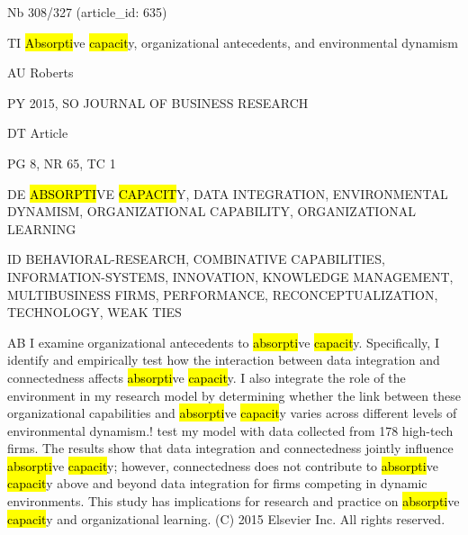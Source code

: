 \documentclass[a4paper]{article}
\begin{document}
\vspace*{-2cm}
Nb \tabto{0cm}308/327 (article\_id: 635)\par
TI \tabto{0cm}\hl{Absorpti}ve \hl{capacit}y, organizational antecedents, and environmental dynamism\par
AU \tabto{0cm}Roberts\par
PY \tabto{0cm}2015, SO JOURNAL OF BUSINESS RESEARCH\par
DT \tabto{0cm}Article\par
PG \tabto{0cm}8, NR 65, TC 1\par
DE \tabto{0cm}\hl{ABSORPTI}VE \hl{CAPACIT}Y, DATA INTEGRATION, ENVIRONMENTAL DYNAMISM, ORGANIZATIONAL CAPABILITY, ORGANIZATIONAL LEARNING\par
ID \tabto{0cm}BEHAVIORAL-RESEARCH, COMBINATIVE CAPABILITIES, INFORMATION-SYSTEMS, INNOVATION, KNOWLEDGE MANAGEMENT, MULTIBUSINESS FIRMS, PERFORMANCE, RECONCEPTUALIZATION, TECHNOLOGY, WEAK TIES\par
AB \tabto{0cm}I examine organizational antecedents to \hl{absorpti}ve \hl{capacit}y. Specifically, I identify and empirically test how the interaction between data integration and connectedness affects \hl{absorpti}ve \hl{capacit}y. I also integrate the role of the environment in my research model by determining whether the link between these organizational capabilities and \hl{absorpti}ve \hl{capacit}y varies across different levels of environmental dynamism.! test my model with data collected from 178 high-tech firms. The results show that data integration and connectedness jointly influence \hl{absorpti}ve \hl{capacit}y; however, connectedness does not contribute to \hl{absorpti}ve \hl{capacit}y above and beyond data integration for firms competing in dynamic environments. This study has implications for research and practice on \hl{absorpti}ve \hl{capacit}y and organizational learning. (C) 2015 Elsevier Inc. All rights reserved.\par
\clearpage
\end{document}
